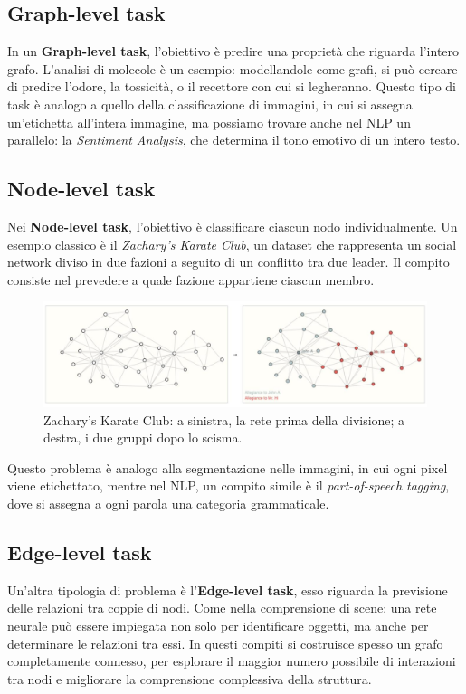 \subsection{Graph-level task}

In un \textbf{Graph-level task}, l’obiettivo è predire una proprietà che riguarda l’intero grafo. L’analisi di molecole è un esempio: modellandole come grafi, si può cercare di predire l’odore, la tossicità, o il recettore con cui si legheranno. Questo tipo di task è analogo a quello della classificazione di immagini, in cui si assegna un’etichetta all’intera immagine, ma possiamo trovare anche nel NLP un parallelo: la \textit{Sentiment Analysis}, che determina il tono emotivo di un intero testo.

\subsection{Node-level task}

Nei \textbf{Node-level task}, l’obiettivo è classificare ciascun nodo individualmente. Un esempio classico è il \textit{Zachary’s Karate Club}, un dataset che rappresenta un social network diviso in due fazioni a seguito di un conflitto tra due leader. Il compito consiste nel prevedere a quale fazione appartiene ciascun membro.
\begin{figure}
    \centering
    \includegraphics[width=\textwidth]{figure/ZachsKarateClubProblem.png}
    \caption{Zachary’s Karate Club: a sinistra, la rete prima della divisione; a destra, i due gruppi dopo lo scisma.}
    \label{fig:ZKCProblem}
\end{figure}
Questo problema è analogo alla segmentazione nelle immagini, in cui ogni pixel viene etichettato, mentre nel NLP, un compito simile è il \textit{part-of-speech tagging}, dove si assegna a ogni parola una categoria grammaticale.

\subsection{Edge-level task}

Un'altra tipologia di problema è l’\textbf{Edge-level task}, esso riguarda la previsione delle relazioni tra coppie di nodi. Come nella comprensione di scene: una rete neurale può essere impiegata non solo per identificare oggetti, ma anche per determinare le relazioni tra essi. In questi compiti si costruisce spesso un grafo completamente connesso, per esplorare il maggior numero possibile di interazioni tra nodi e migliorare la comprensione complessiva della struttura.

